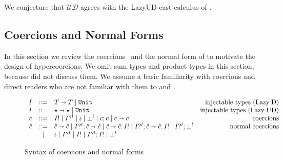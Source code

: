 \documentclass[acmsmall,review,anonymous]{acmart}\settopmatter{printfolios=true,printccs=false,printacmref=false}
\newcommand{\stxrule}[3]{#1 & ::= & #3 & \text{#2}\\}
\newcommand{\stxrulecont}[1]{& | & #1 & \\}
\newcommand{\plus}[0]{+}
\newcommand{\lazyUD}{Lazy\;UD}
\newcommand{\lazyD}{Lazy\;D}
\newcommand{\TOOdyn}[0]{\star}
\newcommand{\POOunit}[0]{\mathtt{Unit}}
\newcommand{\POOfun}[2]{#1 \shortrightarrow #2}
\newcommand{\POOprod}[2]{#1 \times #2}
\newcommand{\POOsum}[2]{#1 \plus #2}
\newcommand{\ncProj}[2]{#1?^{#2}}
\newcommand{\ncInj}[1]{#1!}
\newcommand{\ncId}[0]{\iota}
\newcommand{\ncSeq}[2]{#1;#2}
\newcommand{\ncFail}[1]{\bot^{#1}}
\newcommand{\ncFun}[2]{\POOfun{#1}{#2}}
\newcommand{\ncProd}[2]{\POOprod{#1}{#2}}
\newcommand{\ncSum}[2]{\POOsum{#1}{#2}}
\newcommand{\ineffCEKUD}{$\mathcal{UD}$}
\begin{document}
We conjecture that \ineffCEKUD{} agrees with the \lazyUD{} cast
calculus of \citet{siek2009exploring}.

\clearpage
\pagebreak

\subsection{Coercions and Normal Forms} 
\label{sec:coercion-calculus}

In this section we review the
coercions~\citep{henglein1994dynamic,herman2010space} and the normal
form of \citet{siek2012interpretations} to motivate the design of
hypercoercions.  We omit sum types and product types in this section,
because \citet{siek2012interpretations} did not discuss them. We
assume a basic familiarity with coercions and direct readers who are
not familiar with them to \citet{siek2012interpretations} and
\citet{siek2015blame}.

\begin{figure}
  \[
  \begin{array}{rclr}
  \stxrule{I}{injectable types (\lazyD)}{
    \POOfun{T}{T} \mid \POOunit}
  \stxrule{I}{injectable types (\lazyUD)}{
    \POOfun{\TOOdyn}{\TOOdyn} \mid \POOunit
  }
  \stxrule{c}{coercions}{
    \ncInj{I} \mid
    \ncProj{I}{l} \mid
    \ncId \mid
    \ncFail{l} \mid
    \ncSeq{c}{c} \mid
    \ncFun{c}{c}
  }
\stxrule{\hat{c}}{normal coercions}{
  \ncFun{\hat{c}}{\hat{c}} \mid
  \ncSeq{\ncProj{I}{l}}{\ncFun{\hat{c}}{\hat{c}}} \mid
  \ncSeq{\ncFun{\hat{c}}{\hat{c}}}{\ncInj{I}} \mid
  \ncSeq{\ncProj{I}{l}}{\ncSeq{\ncFun{\hat{c}}{\hat{c}}}{\ncInj{I}}} \mid
  \ncSeq{\ncProj{I}{l}}{\ncFail{l}}
}
\stxrulecont{
  \ncId \mid
  \ncProj{I}{l} \mid
  \ncInj{I} \mid
  \ncSeq{\ncProj{I}{l}}{\ncInj{I}} \mid
  \ncFail{l} 
}
  \end{array}
  \]
  \caption{Syntax of coercions and normal forms}
  \label{fig:normal-coercion}
\end{figure}
\end{document}
